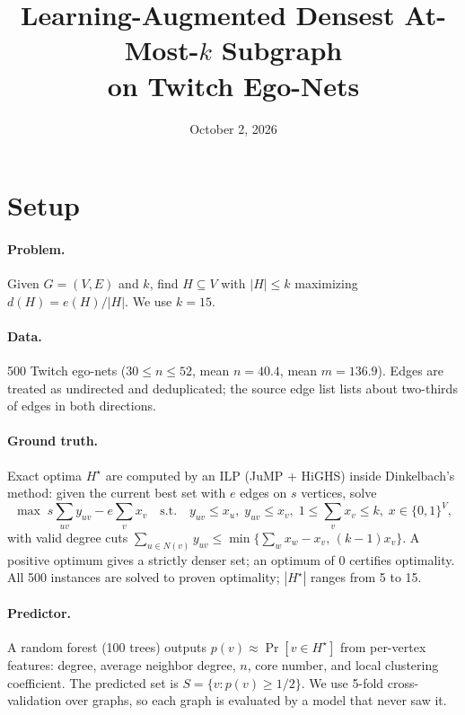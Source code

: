 \documentclass[11pt]{article}
\title{Learning-Augmented Densest At-Most-$k$ Subgraph\\on Twitch Ego-Nets}
\author{}
\date{October 2, 2026}
\begin{document}
\maketitle

\section{Setup}

\paragraph{Problem.} Given $G=(V,E)$ and $k$, find $H \subseteq V$ with $|H|\le k$
maximizing $d(H) = e(H)/|H|$. We use $k=15$.

\paragraph{Data.} 500 Twitch ego-nets ($30 \le n \le 52$, mean $n=40.4$, mean $m=136.9$).
Edges are treated as undirected and deduplicated; the source edge list
lists about two-thirds of edges in both directions.

\paragraph{Ground truth.} Exact optima $H^\star$ are computed by an ILP
(JuMP + HiGHS) inside Dinkelbach's method: given the current best set with $e$ edges on
$s$ vertices, solve
\[
\max\; s\textstyle\sum_{uv} y_{uv} - e \sum_v x_v
\quad\text{s.t.}\quad y_{uv}\le x_u,\; y_{uv}\le x_v,\; 1\le \textstyle\sum_v x_v \le k,\; x\in\{0,1\}^V,
\]
with valid degree cuts $\sum_{u\in N(v)} y_{uv} \le \min\{\sum_w x_w - x_v,\,(k-1)x_v\}$.
A positive optimum gives a strictly denser set; an optimum of $0$ certifies optimality.
All 500 instances are solved to proven optimality; $|H^\star|$ ranges from 5 to 15.

\paragraph{Predictor.} A random forest (100 trees) outputs $p(v)\approx\Pr[v\in H^\star]$
from per-vertex features: degree, average neighbor degree, $n$, core number, and local
clustering coefficient. The predicted set is $S=\{v : p(v)\ge 1/2\}$.
We use 5-fold cross-validation over graphs, so each graph is evaluated by a model that
never saw it.
\end{document}
